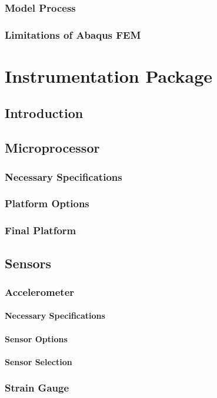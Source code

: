 \documentclass[twoside,11pt]{report}
\begin{document}
		\subsection{Model Process}
		\subsection{Limitations of Abaqus FEM}

\chapter{Instrumentation Package}
	\section{Introduction}
	\section{Microprocessor}
		\subsection{Necessary Specifications}
		\subsection{Platform Options}
		\subsection{Final Platform}

	\section{Sensors}
		\subsection{Accelerometer}
			\subsubsection{Necessary Specifications}
			\subsubsection{Sensor Options}
			\subsubsection{Sensor Selection}
		\subsection{Strain Gauge}
\end{document}
